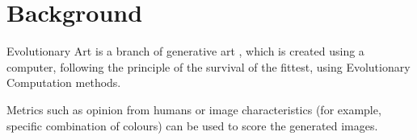 

\section{Background}

Evolutionary Art \cite{EART} is a branch of generative art \cite{PHEROGRAPHY}, which is created using a
computer, following the principle of the survival of the fittest, 
using Evolutionary Computation methods.

Metrics such as opinion from humans or image characteristics (for
example, specific combination of colours) can be used to score the
generated images. %

